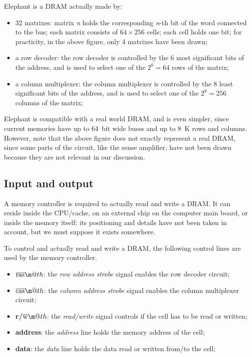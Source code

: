 \documentclass[a4paper,12pt]{article}
\makeatletter
\newcommand*{\textoverline}[1]{$\overline{\hbox{#1}}\m@th$}
\newcommand{\memoryname}{Elephant}
\makeatother
\begin{document}
\memoryname{} is a DRAM actually made by:
\begin{itemize}
  \item 32 matrixes: matrix \emph{n} holds the corresponding \emph{n}-th bit of the word connected to the bus;
  each matrix consists of $64 \times 256$ cells;
  each cell holds one bit;
  for practicity, in the above figure, only 4 matrixes have been drawn;
  \item a row decoder: the row decoder is controlled by the 6 most significant bits of the address, and is used to select one of the $2^{6} = 64$ rows of the matrix;
  \item a column multiplexer: the column multiplexer is controlled by the 8 least significant bits of the address, and is used to select one of the $2^{8} = 256$ columns of the matrix;
\end{itemize}

\memoryname{} is compatible with a real world DRAM, and is even simpler, since current memories have up to 64~bit wide buses and up to 8~K rows and columns.
\\
However, note that the above figure does not exactly represent a real DRAM, since some parts of the circuit, like the sense amplifier, have not been drawn because they are not relevant in our discussion.

\subsection{Input and output}
A memory controller is required to actually read and write a DRAM.
It can reside inside the CPU/cache, on an external chip on the computer main board, or inside the memory itself; its positioning and details have not been taken in account, but we must suppose it exists somewhere.

To control and actually read and write a DRAM, the following control lines are used by the memory controller.

\begin{itemize}
  \item \textbf{\textoverline{ras}}: the \emph{row address strobe} signal enables the row decoder circuit;
  \item \textbf{\textoverline{cas}}: the \emph{column address strobe} signal enables the column multiplexer circuit;
  \item \textbf{r/\textoverline{w}}: the \emph{read/write} signal controls if the cell has to be read or written;
  \item \textbf{address}: the \emph{address} line holds the memory address of the cell;
  \item \textbf{data}: the \emph{data} line holds the data read or written from/to the cell;
\end{itemize}
\end{document}
